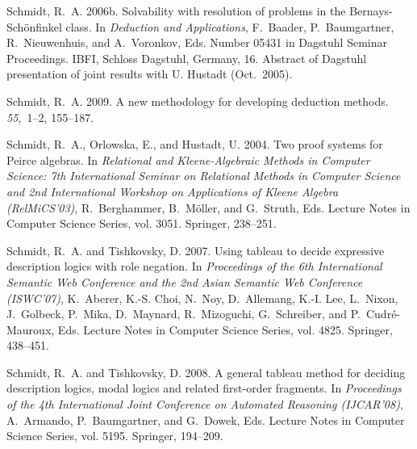 \documentclass[leqno
,pdflatex
,prodmode
,acmtocl
]{acmsmall}
\begin{document}
\begin{thebibliography}{}
{\sc Schmidt, R.~A.} 2006b.
\newblock Solvability with resolution of problems in the
  {B}ernays-{S}ch\"onfinkel class.
\newblock In {\em Deduction and Applications}, {F.~Baader}, {P.~Baumgartner},
  {R.~Nieuwenhuis}, {and} {A.~Voronkov}, Eds. Number 05431 in Dagstuhl Seminar
  Proceedings. IBFI, Schloss Dagstuhl, Germany, 16.
\newblock Abstract of Dagstuhl presentation of joint results with U. Hustadt
  (Oct.\ 2005).

{\sc Schmidt, R.~A.} 2009.
\newblock A new methodology for developing deduction methods.
~{\em
  55,\/}~1--2, 155--187.

{\sc Schmidt, R.~A.}, {\sc Orlowska, E.}, {\sc and} {\sc Hustadt, U.} 2004.
\newblock Two proof systems for {P}eirce algebras.
\newblock In {\em Relational and Kleene-Algebraic Methods in Computer Science:
  7th International Seminar on Relational Methods in Computer Science and 2nd
  International Workshop on Applications of Kleene Algebra ({RelMiCS}'03)},
  {R.~Berghammer}, {B.~M{\"o}ller}, {and} {G.~Struth}, Eds. Lecture Notes in
  Computer Science Series, vol. 3051. Springer, 238--251.

{\sc Schmidt, R.~A.} {\sc and} {\sc Tishkovsky, D.} 2007.
\newblock Using tableau to decide expressive description logics with role
  negation.
\newblock In {\em Proceedings of the 6th International Semantic Web Conference
  and the 2nd Asian Semantic Web Conference ({ISWC}'07)}, {K.~Aberer}, {K.-S.
  Choi}, {N.~Noy}, {D.~Allemang}, {K.-I. Lee}, {L.~Nixon}, {J.~Golbeck},
  {P.~Mika}, {D.~Maynard}, {R.~Mizoguchi}, {G.~Schreiber}, {and}
  {P.~Cudr\'{e}-Mauroux}, Eds. Lecture Notes in Computer Science Series, vol.
  4825. Springer, 438--451.

{\sc Schmidt, R.~A.} {\sc and} {\sc Tishkovsky, D.} 2008.
\newblock A general tableau method for deciding description logics, modal
  logics and related first-order fragments.
\newblock In {\em Proceedings of the 4th International Joint Conference on
  Automated Reasoning ({IJCAR}'08)}, {A.~Armando}, {P.~Baumgartner}, {and}
  {G.~Dowek}, Eds. Lecture Notes in Computer Science Series, vol. 5195.
  Springer, 194--209.


\end{thebibliography}
\end{document}
